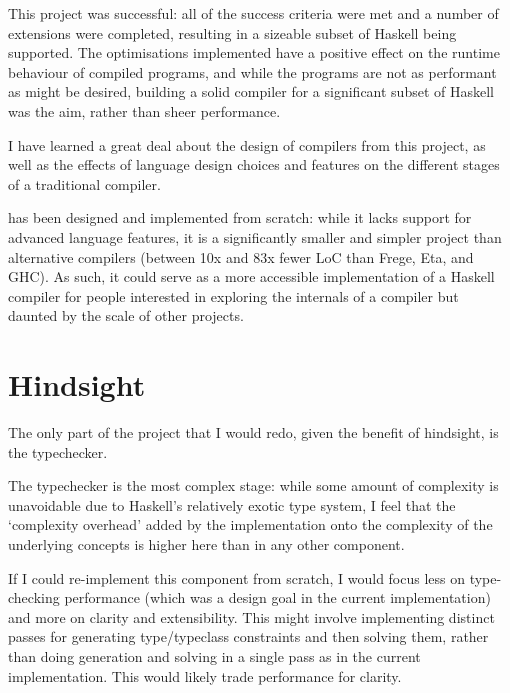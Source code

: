 \documentclass[dissertation.tex]{subfiles}
\begin{document}
This project was successful: all of the success criteria were met and a number of extensions were completed, resulting in a sizeable subset of Haskell being supported. The optimisations implemented have a positive effect on the runtime behaviour of compiled programs, and while the programs are not as performant as might be desired, building a solid compiler for a significant subset of Haskell was the aim, rather than sheer performance.

I have learned a great deal about the design of compilers from this project, as well as the effects of language design choices and features on the different stages of a traditional compiler.

\compilername has been designed and implemented from scratch: while it lacks support for advanced language features, it is a significantly smaller and simpler project than alternative compilers (between 10x and 83x fewer LoC than Frege, Eta, and GHC). As such, it could serve as a more accessible implementation of a Haskell compiler for people interested in exploring the internals of a compiler but daunted by the scale of other projects.

\section{Hindsight}
{
    The only part of the project that I would redo, given the benefit of hindsight, is the typechecker.

    The typechecker is the most complex stage: while some amount of complexity is unavoidable due to Haskell's relatively exotic type system, I feel that the `complexity overhead' added by the implementation onto the complexity of the underlying concepts is higher here than in any other component.

    If I could re-implement this component from scratch, I would focus less on type-checking performance (which was a design goal in the current implementation) and more on clarity and extensibility. This might involve implementing distinct passes for generating type/typeclass constraints and then solving them, rather than doing generation and solving in a single pass as in the current implementation. This would likely trade performance for clarity. 
}
\end{document}
